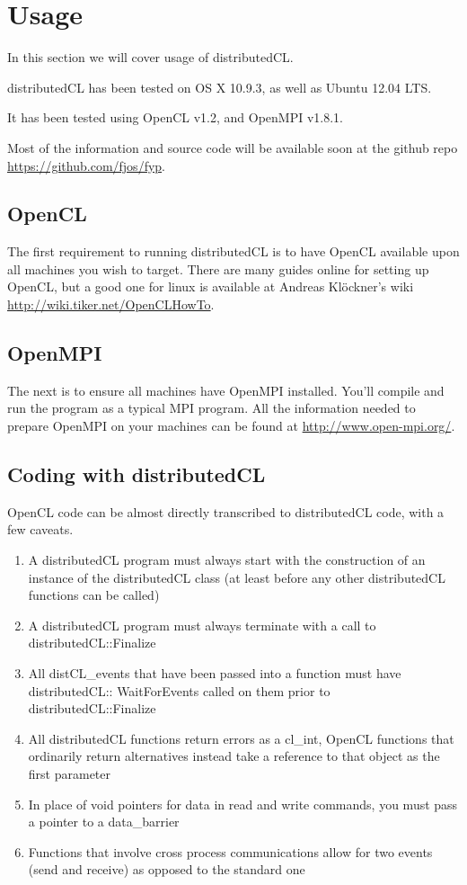 \documentclass[../thesis.tex]{subfiles}
\begin{document}
\section{Usage} %
\label{sec:usage}

In this section we will cover usage of distributedCL.

distributedCL has been tested on OS X 10.9.3, as well as Ubuntu 12.04 LTS.

It has been tested using OpenCL v1.2, and OpenMPI v1.8.1.

Most of the information and source code will be available soon at the github repo \url{https://github.com/fjos/fyp}.

\subsection{OpenCL} %
\label{sub:opencl_use}
    The first requirement to running distributedCL is to have OpenCL available upon all machines you wish to target. There are many guides online for setting up OpenCL, but a good one for linux is available at Andreas Klöckner's wiki \url{http://wiki.tiker.net/OpenCLHowTo}.
\subsection{OpenMPI} %
\label{sub:openmpi_use}
    The next is to ensure all machines have OpenMPI installed. You'll compile and run the program as a typical MPI program. All the information needed to prepare OpenMPI on your machines can be found at \url{http://www.open-mpi.org/}.

\subsection{Coding with distributedCL} %
\label{sub:coding_with_distributedcl}
    OpenCL code can be almost directly transcribed to distributedCL code, with a few caveats.
    \begin{enumerate}
    \item A distributedCL program must always start with the construction of an instance of the distributedCL class (at least before any other distributedCL functions can be called)
    \item A distributedCL program must always terminate with a call to distributedCL::Finalize
    \item All distCL\_events that have been passed into a function must have distributedCL:: WaitForEvents called on them prior to distributedCL::Finalize
    \item All distributedCL functions return errors as a cl\_int, OpenCL functions that ordinarily return alternatives instead take a reference to that object as the first parameter
    \item In place of void pointers for data in read and write commands, you must pass a pointer to a data\_barrier
    \item Functions that involve cross process communications allow for two events (send and receive) as opposed to the standard one
    \end{enumerate}
    
\end{document}
